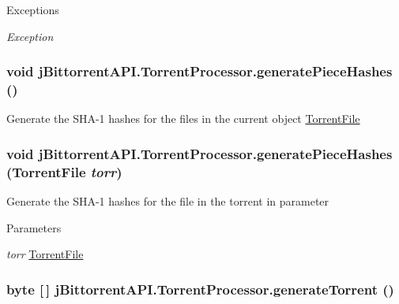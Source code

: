 \begin{DoxyExceptions}{Exceptions}
\item[{\em Exception}]\end{DoxyExceptions}
\hypertarget{classj_bittorrent_a_p_i_1_1_torrent_processor_a7c547dbac2b9cf1afd785558c2d7c89b}{
\subsubsection[{generatePieceHashes}]{\setlength{\rightskip}{0pt plus 5cm}void jBittorrentAPI.TorrentProcessor.generatePieceHashes ()}}
\label{classj_bittorrent_a_p_i_1_1_torrent_processor_a7c547dbac2b9cf1afd785558c2d7c89b}
Generate the SHA-\/1 hashes for the files in the current object \hyperlink{classj_bittorrent_a_p_i_1_1_torrent_file}{TorrentFile} \hypertarget{classj_bittorrent_a_p_i_1_1_torrent_processor_a86fd402a8e9b6a1dbc4c26645dd42d8b}{
\subsubsection[{generatePieceHashes}]{\setlength{\rightskip}{0pt plus 5cm}void jBittorrentAPI.TorrentProcessor.generatePieceHashes ({\bf TorrentFile} {\em torr})}}
\label{classj_bittorrent_a_p_i_1_1_torrent_processor_a86fd402a8e9b6a1dbc4c26645dd42d8b}
Generate the SHA-\/1 hashes for the file in the torrent in parameter 
\begin{DoxyParams}{Parameters}
\item[{\em torr}]\hyperlink{classj_bittorrent_a_p_i_1_1_torrent_file}{TorrentFile} \end{DoxyParams}
\hypertarget{classj_bittorrent_a_p_i_1_1_torrent_processor_a8ac41276f857bafc5e0facbe615a3332}{
\subsubsection[{generateTorrent}]{\setlength{\rightskip}{0pt plus 5cm}byte \mbox{[}$\,$\mbox{]} jBittorrentAPI.TorrentProcessor.generateTorrent ()}}
